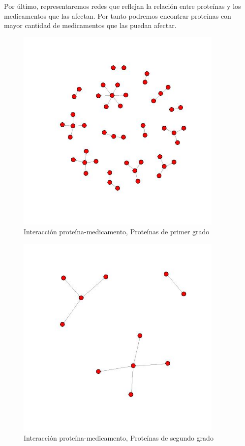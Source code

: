 Por último, representaremos redes que reflejan la relación entre proteínas y los medicamentos que las afectan. Por tanto podremos encontrar proteínas con mayor cantidad de medicamentos que las puedan afectar.

\begin{figure}[h]
			\includegraphics[width=0.9\textwidth]{figures/Red-medicamento-proteina1.jpeg}
			\caption{Interacción proteína-medicamento, Proteínas de primer grado}
\end{figure}
\clearpage
\begin{figure}[h]
			\includegraphics[width=0.9\textwidth]{figures/Red-medicamento-proteina2.jpeg}
			\caption{Interacción proteína-medicamento, Proteínas de segundo grado}
\end{figure}

